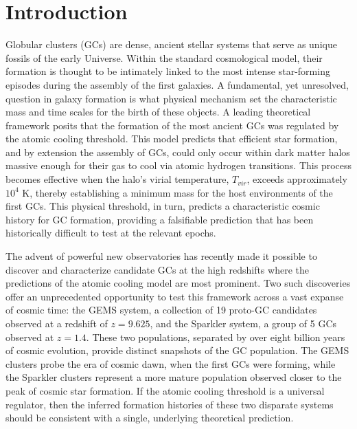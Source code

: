 \documentclass[]{article}
\begin{document}
\section{Introduction}
\label{sec:intro}
Globular clusters (GCs) are dense, ancient stellar systems that serve as unique fossils of the early Universe. Within the standard cosmological model, their formation is thought to be intimately linked to the most intense star-forming episodes during the assembly of the first galaxies. A fundamental, yet unresolved, question in galaxy formation is what physical mechanism set the characteristic mass and time scales for the birth of these objects. A leading theoretical framework posits that the formation of the most ancient GCs was regulated by the atomic cooling threshold. This model predicts that efficient star formation, and by extension the assembly of GCs, could only occur within dark matter halos massive enough for their gas to cool via atomic hydrogen transitions. This process becomes effective when the halo's virial temperature, $T_{vir}$, exceeds approximately $10^4$ K, thereby establishing a minimum mass for the host environments of the first GCs. This physical threshold, in turn, predicts a characteristic cosmic history for GC formation, providing a falsifiable prediction that has been historically difficult to test at the relevant epochs.

The advent of powerful new observatories has recently made it possible to discover and characterize candidate GCs at the high redshifts where the predictions of the atomic cooling model are most prominent. Two such discoveries offer an unprecedented opportunity to test this framework across a vast expanse of cosmic time: the GEMS system, a collection of 19 proto-GC candidates observed at a redshift of $z=9.625$, and the Sparkler system, a group of 5 GCs observed at $z=1.4$. These two populations, separated by over eight billion years of cosmic evolution, provide distinct snapshots of the GC population. The GEMS clusters probe the era of cosmic dawn, when the first GCs were forming, while the Sparkler clusters represent a more mature population observed closer to the peak of cosmic star formation. If the atomic cooling threshold is a universal regulator, then the inferred formation histories of these two disparate systems should be consistent with a single, underlying theoretical prediction.
\end{document}
